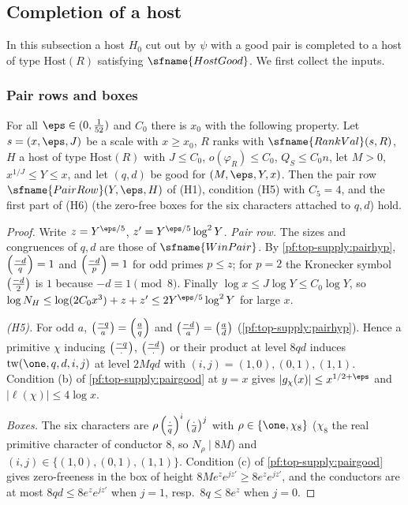 \subsection{Completion of a host}\label{sec:pf:top-supply:completion}

In this subsection a host $H_0$ cut out by $\psi$ with a good pair is completed to a host of type $\mathrm{Host}(R)$
satisfying $\sfname{HostGood}$. We first collect the inputs.

\subsubsection{Pair rows and boxes}

\begin{lemma}\label{pf:top-supply:pairrows}
For all $\eps\in(0,\frac1{52})$ and $C_0$ there is $x_0$ with the following property. Let $s=(x,\eps,J)$ be a scale with
$x\ge x_0$, $R$ ranks with $\sfname{RankVal}(s,R)$, $H$ a host of type $\mathrm{Host}(R)$ with $J\le C_0$, $o(\varphi_R)\le C_0$,
$Q_S\le C_0n$, let $M>0$, $x^{1/J}\le Y\le x$, and let $(q,d)$ be good for $(M,\eps,Y,x)$. Then the pair row
$\sfname{PairRow}(Y,\eps,H)$ of (H1), condition (H5) with $C_5=4$, and the first part of (H6) (the zero-free boxes for the
six characters attached to $q,d$) hold.
\end{lemma}

\begin{proof}
Write $z=Y^{\eps/5}$, $z'=Y^{\eps/5}\log^2Y$. \emph{Pair row.} The sizes and congruences of $q,d$ are those of
$\sfname{WinPair}$. By \cref{pf:top-supply:pairhyp}, $\left(\frac{-d}{q}\right)=1$ and $\left(\frac{-d}{p}\right)=1$ for odd primes $p\le z$;
for $p=2$ the Kronecker symbol $\left(\frac{-d}{2}\right)$ is $1$ because $-d\equiv1\pmod8$. Finally $\log x\le J\log Y\le
C_0\log Y$, so $\log N_H\le\log(2C_0x^{3})+z+z'\le2Y^{\eps/5}\log^2Y$ for large $x$.

\emph{(H5).} For odd $a$, $\left(\frac{-q}{a}\right)=\left(\frac{a}{q}\right)$ and $\left(\frac{-d}{a}\right)=\left(\frac{a}{d}\right)$
(\cref{pf:top-supply:pairhyp}). Hence a primitive $\chi$ inducing $\left(\frac{-q}{\cdot}\right)$, $\left(\frac{-d}{\cdot}\right)$ or their
product at level $8qd$ induces $\topsupplytw(\one,q,d,i,j)$ at level $2Mqd$ with $(i,j)=(1,0),(0,1),(1,1)$. Condition (b) of
\cref{pf:top-supply:pairgood} at $y=x$ gives $|g_\chi(x)|\le x^{1/2+\eps}$ and $|\ell(\chi)|\le4\log x$.

\emph{Boxes.} The six characters are $\rho\left(\frac{\cdot}{q}\right)^i\left(\frac{\cdot}{d}\right)^j$ with $\rho\in\{\one,\chi_8\}$ ($\chi_8$ the
real primitive character of conductor $8$, so $N_\rho\mid8M$) and $(i,j)\in\{(1,0),(0,1),(1,1)\}$. Condition (c) of
\cref{pf:top-supply:pairgood} gives zero-freeness in the box of height $8Me^ze^{jz'}\ge8e^ze^{jz'}$, and the conductors are
at most $8qd\le8e^ze^{jz'}$ when $j=1$, resp.\ $8q\le8e^z$ when $j=0$.
\end{proof}

